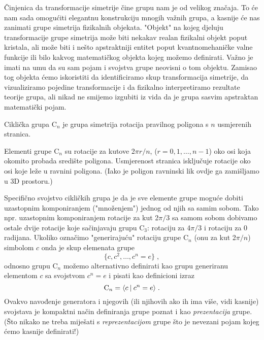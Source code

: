 Činjenica da transformacije simetrije čine grupu nam je od velikog
značaja. To će nam sada omogućiti elegantnu konstrukciju mnogih važnih
grupa, a kasnije će nas zanimati grupe simetrija fizikalnih
objekata.
"Objekt" na kojeg djeluju transformacije grupe simetrija može biti
nekakav realan fizikalni objekt poput kristala, ali može biti i
nešto apstraktniji entitet poput kvantnomehaničke valne funkcije
ili bilo kakvog matematičkog objekta kojeg možemo definirati.
Važno je imati na umu da su sam pojam i svojstva grupe neovisni o
tom objektu. Zamisao tog objekta ćemo iskoristiti da identificiramo skup transformacija
simetrije, da vizualiziramo pojedine transformacije i da
fizikalno interpretiramo rezultate teorije grupa, ali nikad
ne smijemo izgubiti iz vida da je grupa sasvim apstraktan matematički pojam.


\begin{primjer}
Ciklička grupa C$_n$ je grupa simetrija rotacija pravilnog poligona s $n$
usmjerenih stranica.
\end{primjer}

\centerline{}

Elementi grupe C$_n$ su rotacije za kutove 2$\pi r/n$, ($r=0,1,\ldots, n-1$)
oko osi koja okomito probada središte poligona. Usmjerenost
stranica isključuje rotacije oko osi koje leže u ravnini poligona. 
(Iako je poligon ravninski lik ovdje ga zamišljamo u 3D prostoru.)

Specifično svojstvo cikličkih grupa je da je sve elemente grupe moguće
dobiti uzastopnim komponiranjem ("množenjem") jednog od njih sa samim sobom.
Tako npr. uzastopnim komponiranjem rotacije za kut 2$\pi/3$ sa samom sobom dobivamo ostale
dvije rotacije koje sačinjavaju grupu C$_3$: rotaciju za 4$\pi/3$ i
rotaciju za 0 radijana. 
Ukoliko označimo "generirajuću" rotaciju grupe C$_n$ (onu za kut 2$\pi/n$) simbolom 
$c$ onda je skup elemenata grupe
\begin{equation}
 \{c,c^2, \ldots , c^n=e \} \;,
\label{eq:cn}
\end{equation}
odnosno grupu C$_n$ možemo alternativno definirati kao grupu generiranu
elementom $c$ sa svojstvom $c^n=e$ i pisati kao definicioni izraz
\begin{equation}
 {\rm C}_n = \langle c \: | \: c^n=e \rangle \;.
\label{eq:cngp}
\end{equation}
Ovakvo navođenje generatora i njegovih (ili njihovih ako ih ima više, vidi kasnije)
svojstava je kompaktni način definiranja grupe poznat i kao \emph{prezentacija}
grupe. (Što nikako ne treba miješati s \emph{reprezentacijom} grupe što je nevezani
pojam kojeg ćemo kasnije definirati!)

